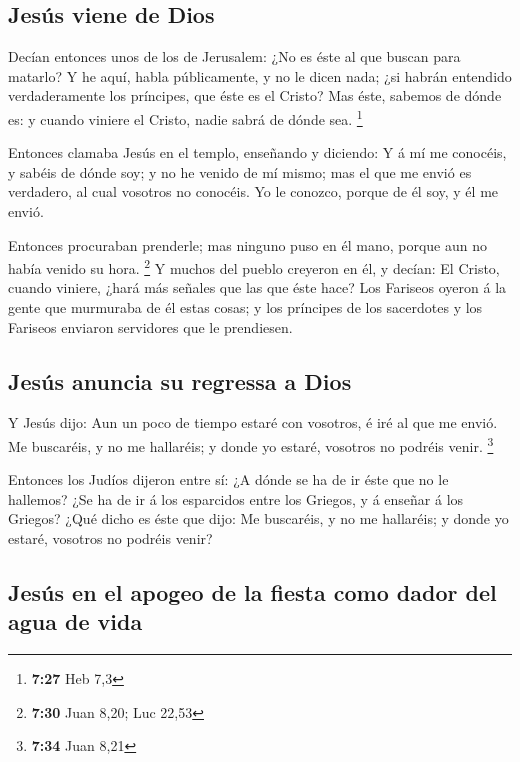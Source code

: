 \hypertarget{jesuxfas-viene-de-dios}{%
\subsection{Jesús viene de Dios}\label{jesuxfas-viene-de-dios}}

 Decían entonces unos de los de Jerusalem: ¿No es éste al
que buscan para matarlo?  Y he aquí, habla públicamente, y
no le dicen nada; ¿si habrán entendido verdaderamente los príncipes, que
éste es el Cristo?  Mas éste, sabemos de dónde es: y cuando
viniere el Cristo, nadie sabrá de dónde sea. \footnote{\textbf{7:27} Heb
  7,3}

 Entonces clamaba Jesús en el templo, enseñando y diciendo:
Y á mí me conocéis, y sabéis de dónde soy; y no he venido de mí mismo;
mas el que me envió es verdadero, al cual vosotros no conocéis.
 Yo le conozco, porque de él soy, y él me envió.

 Entonces procuraban prenderle; mas ninguno puso en él
mano, porque aun no había venido su hora. \footnote{\textbf{7:30} Juan
  8,20; Luc 22,53}  Y muchos del pueblo creyeron en él, y
decían: El Cristo, cuando viniere, ¿hará más señales que las que éste
hace?  Los Fariseos oyeron á la gente que murmuraba de él
estas cosas; y los príncipes de los sacerdotes y los Fariseos enviaron
servidores que le prendiesen.

\hypertarget{jesuxfas-anuncia-su-regressa-a-dios}{%
\subsection{Jesús anuncia su regressa a
Dios}\label{jesuxfas-anuncia-su-regressa-a-dios}}

 Y Jesús dijo: Aun un poco de tiempo estaré con vosotros, é
iré al que me envió.  Me buscaréis, y no me hallaréis; y
donde yo estaré, vosotros no podréis venir. \footnote{\textbf{7:34} Juan
  8,21}

 Entonces los Judíos dijeron entre sí: ¿A dónde se ha de ir
éste que no le hallemos? ¿Se ha de ir á los esparcidos entre los
Griegos, y á enseñar á los Griegos?  ¿Qué dicho es éste que
dijo: Me buscaréis, y no me hallaréis; y donde yo estaré, vosotros no
podréis venir?

\hypertarget{jesuxfas-en-el-apogeo-de-la-fiesta-como-dador-del-agua-de-vida}{%
\subsection{Jesús en el apogeo de la fiesta como dador del agua de
vida}\label{jesuxfas-en-el-apogeo-de-la-fiesta-como-dador-del-agua-de-vida}}

